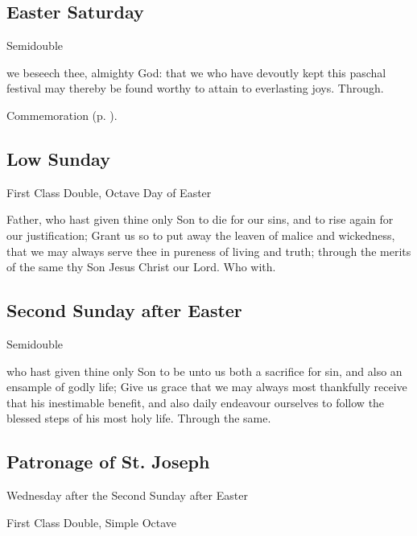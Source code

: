 \subsection{Easter Saturday}
\begin{inhead}
    {Semidouble}
\end{inhead}

\collect
{} we beseech thee, almighty God: that we who have devoutly kept this paschal festival may thereby be found worthy to attain to everlasting joys. Through.
\begin{rubric}
    Commemoration  (p. \pageref{EasterCollect}).
\end{rubric}


\subsection{Low Sunday}
\begin{inhead}
    {First Class Double, Octave Day of Easter}
\end{inhead}

\collect
{} Father, who hast given thine only Son to die for our sins, and to rise again for our justification; Grant us so to put away the leaven of malice and wickedness, that we may always serve thee in pureness of living and truth; through the merits of the same thy Son Jesus Christ our Lord. Who with.


\subsection{Second Sunday after Easter}\label{EasterII}
\begin{inhead}
    {Semidouble}
\end{inhead}

\collect\label{EasterIICollect}
 who hast given thine only Son to be unto us both a sacrifice for sin, and also an ensample of godly life; Give us grace that we may always most thankfully receive that his inestimable benefit, and also daily endeavour ourselves to follow the blessed steps of his most holy life. Through the same.


\subsection{Patronage of St. Joseph}
\begin{inhead}
    {Wednesday after the Second Sunday after Easter}\par
    {First Class Double, Simple Octave}
\end{inhead}

